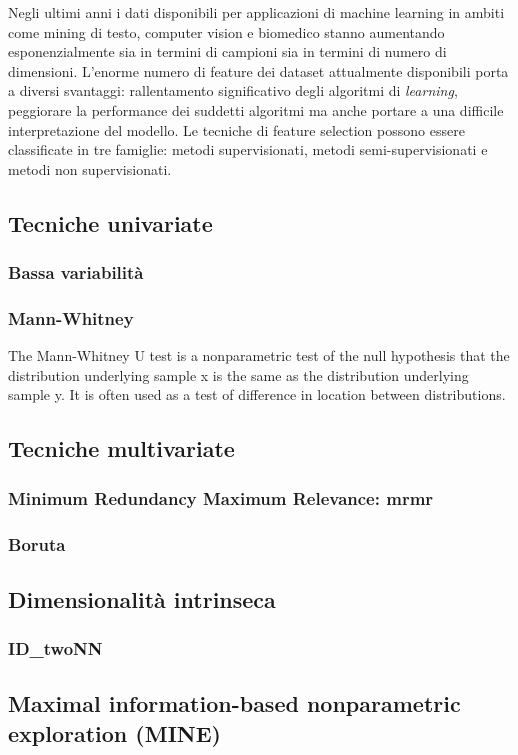 \documentclass[12pt,italian]{report}
\begin{document}
	Negli ultimi anni i dati disponibili per applicazioni di machine learning in ambiti come mining di testo, computer vision e biomedico stanno aumentando esponenzialmente sia in termini di campioni sia in termini di numero di dimensioni. L'enorme numero di feature dei dataset attualmente disponibili porta a diversi svantaggi: rallentamento significativo degli algoritmi di \textit{learning}, peggiorare la performance dei suddetti algoritmi ma anche portare a una difficile interpretazione del modello.
	Le tecniche di feature selection possono essere classificate in tre famiglie: metodi supervisionati, metodi semi-supervisionati e metodi non supervisionati.
	
	\subsection{Tecniche univariate}
	\subsubsection{Bassa variabilità}
	\subsubsection{Mann-Whitney}
	The Mann-Whitney U test is a nonparametric test of the null hypothesis that the distribution underlying sample x is the same as the distribution underlying sample y. It is often used as a test of difference in location between distributions.
	\subsection{Tecniche multivariate}
	\subsubsection{Minimum Redundancy Maximum Relevance: mrmr}
	\subsubsection{Boruta}
	\subsection{Dimensionalità intrinseca}
	\subsubsection{ID\_twoNN}
	\subsection{Maximal information-based nonparametric exploration (MINE)}
\end{document}
